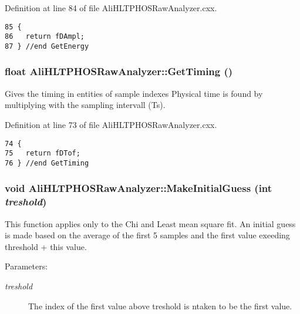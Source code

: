 Definition at line 84 of file Ali\-HLTPHOSRaw\-Analyzer.cxx.

\footnotesize\begin{verbatim}85 {
86   return fDAmpl;
87 } //end GetEnergy
\end{verbatim}\normalsize 


\subsubsection{\setlength{\rightskip}{0pt plus 5cm}float Ali\-HLTPHOSRaw\-Analyzer::Get\-Timing ()\hspace{0.3cm}{\tt  [inherited]}}\label{classAliHLTPHOSRawAnalyzer_AliHLTPHOSRawAnalyzerPeakFindera10}


Gives the timing in entities of sample indexes Physical time is found by multiplying with the sampling intervall (Ts). 

Definition at line 73 of file Ali\-HLTPHOSRaw\-Analyzer.cxx.

\footnotesize\begin{verbatim}74 {
75   return fDTof;
76 } //end GetTiming
\end{verbatim}\normalsize 


\subsubsection{\setlength{\rightskip}{0pt plus 5cm}void Ali\-HLTPHOSRaw\-Analyzer::Make\-Initial\-Guess (int {\em treshold})\hspace{0.3cm}{\tt  [inherited]}}\label{classAliHLTPHOSRawAnalyzer_AliHLTPHOSRawAnalyzerPeakFindera15}


This function applies only to the Chi and Least mean square fit. An initial guess is made based on the average of the first 5 samples and the first value exeeding threshold + this value. \begin{Desc}
\item[Parameters:]
\begin{description}
\item[{\em treshold}]The index of the first value above treshold is ntaken to be the first value. \end{description}
\end{Desc}



